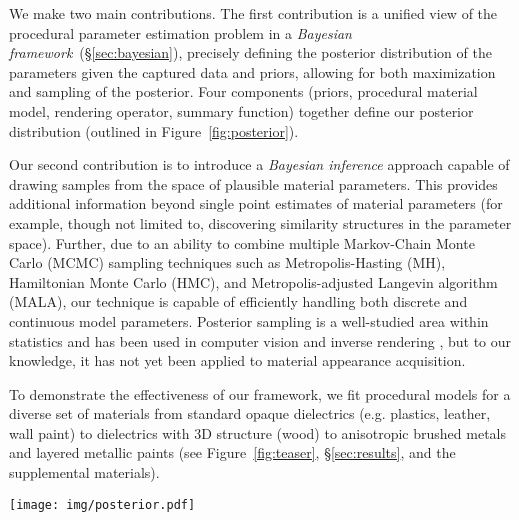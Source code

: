 We make two main contributions. The first contribution is a unified view of the procedural parameter estimation problem in a \emph{Bayesian framework}~(\S\ref{sec:bayesian}), precisely defining the posterior distribution of the parameters given the captured data and priors, allowing for both maximization and sampling of the posterior. Four components (priors, procedural material model, rendering operator, summary function) together define our posterior distribution (outlined in Figure~\ref{fig:posterior}). %

Our second contribution is to introduce a \emph{Bayesian inference} approach capable of drawing samples from the space of plausible material parameters.
This provides additional information beyond single point estimates of material parameters (for example, though not limited to, discovering similarity structures in the parameter space).
Further, due to an ability to combine multiple Markov-Chain Monte Carlo (MCMC) sampling techniques such as Metropolis-Hasting (MH), Hamiltonian Monte Carlo (HMC), and Metropolis-adjusted Langevin algorithm (MALA), our technique is capable of efficiently handling both discrete and continuous model parameters.
Posterior sampling is a well-studied area within statistics and has been used in computer vision and inverse rendering \cite{Picture}, but to our knowledge, it has not yet been applied to material appearance acquisition.

To demonstrate the effectiveness of our framework, we fit procedural models for a diverse set of materials from standard opaque dielectrics (e.g. plastics, leather, wall paint) to dielectrics with 3D structure (wood) to anisotropic brushed metals and layered metallic paints (see Figure~\ref{fig:teaser}, \S\ref{sec:results}, and the supplemental materials).


\begin{figure*}[t]
	\texttt{[image: img/posterior.pdf]}
	\captionsetup{labelfont=bf,textfont=it}
	\caption{Our posterior computation combines priors, a procedural material model, a rendering operator, a summary function, and a target image. This posterior distribution can then be sampled to provide plausible values of the parameter vector. The value of the posterior is computed up to a normalization term, which does not effect MCMC sampling. The entire posterior definition is differentiable in the material parameters (excluding optional discrete model parameters).}
	\label{fig:posterior}
\end{figure*}

